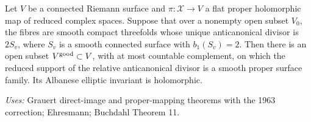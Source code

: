 \begin{lemma}[PUSH D.1.2; T]\label{push:D.1.2}
Let \(V\) be a connected Riemann surface and
\(\pi:\mathcal X\to V\) a flat proper holomorphic map of reduced
complex spaces. Suppose that over a nonempty open subset \(V_0\), the
fibres are smooth compact threefolds whose unique anticanonical divisor
is \(2S_v\), where \(S_v\) is a smooth connected surface with
\(b_1(S_v)=2\). Then there is an open subset \(V^{\rm good}\subset V\), with at
most countable complement, on which the reduced support of the
relative anticanonical divisor is a smooth proper surface family. Its
Albanese elliptic invariant is holomorphic.
\end{lemma}
\noindent\emph{Uses:} Grauert direct-image and proper-mapping theorems with the 1963 correction; Ehresmann; Buchdahl Theorem 11.\par

